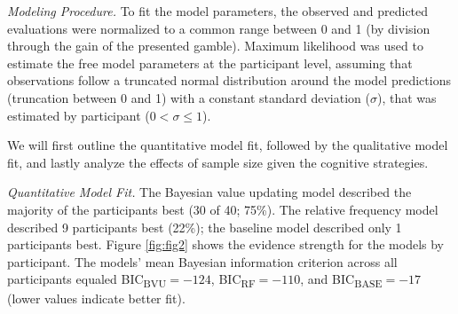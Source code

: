 \documentclass[a4paper, man, floatsintext]{apa6}
\begin{document}
\textit{Modeling Procedure.} To fit the model parameters, the observed
and predicted evaluations were normalized to a common range between 0
and 1 (by division through the gain of the presented gamble). Maximum
likelihood was used to estimate the free model parameters at the
participant level, assuming that observations follow a truncated normal
distribution around the model predictions (truncation between 0 and 1)
with a constant standard deviation (\(\sigma\)), that was estimated by
participant (\(0 < \sigma \leq 1\)).

We will first outline the quantitative model fit, followed by the
qualitative model fit, and lastly analyze the effects of sample size
given the cognitive strategies.

\textit{Quantitative Model Fit.} The Bayesian value updating model
described the majority of the participants best (30 of 40; 75\%). The
relative frequency model described 9 participants best (22\%); the
baseline model described only 1 participants best. Figure \ref{fig:fig2}
shows the evidence strength for the models by participant. The models'
mean Bayesian information criterion across all participants equaled
BIC\textsubscript{BVU}\(= -124\), BIC\textsubscript{RF}\(= -110\), and
BIC\textsubscript{BASE}\(= -17\) (lower values indicate better fit).
\end{document}
